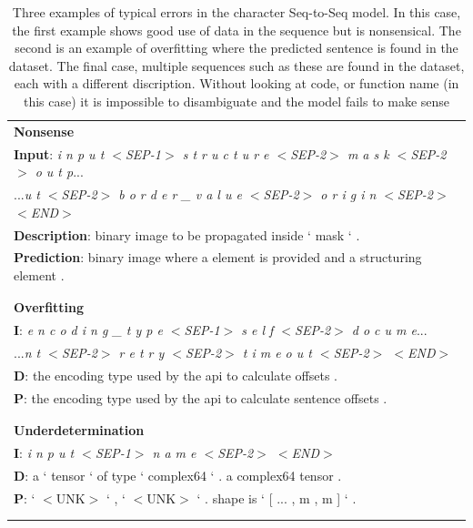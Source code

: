 \begin{table}
\begin{center}
\begin{tabular}{ l  }

\textbf{Nonsense}\\

\textbf{Input}: \textit{i n p u t $<$SEP-1$>$ s t r u c t u r e $<$SEP-2$>$ m a s k $<$SEP-2$>$ o u t p}...\\
...\textit{u t $<$SEP-2$>$ b o r d e r \_ v a l u e $<$SEP-2$>$ o r i g i n $<$SEP-2$>$ $<$END$>$}\\
\textbf{Description}: binary image to be propagated inside ` mask ` .\\
\textbf{Prediction}: binary image where a element is provided and a structuring element . \\

\\\hline\\


\textbf{Overfitting}\\

\textbf{I}: \textit{e n c o d i n g \_ t y p e $<$SEP-1$>$ s e l f $<$SEP-2$>$ d o c u m e}...\\
...\textit{n t $<$SEP-2$>$ r e t r y $<$SEP-2$>$ t i m e o u t $<$SEP-2$>$ $<$END$>$}\\
\textbf{D}: the encoding type used by the api to calculate offsets .\\
\textbf{P}: the encoding type used by the api to calculate sentence offsets . \\
\\\hline\\

\textbf{Underdetermination}\\

\textbf{I}: \textit{i n p u t $<$SEP-1$>$ n a m e $<$SEP-2$>$ $<$END$>$}\\
\textbf{D}: a ` tensor ` of type ` complex64 ` . a complex64 tensor .\\
\textbf{P}: ` $<$UNK$>$ ` , ` $<$UNK$>$ ` . shape is ` [ ... , m , m ] ` . \\
\\\hline\\
\end{tabular}

\caption{Three examples of typical errors in the character Seq-to-Seq model.  In this case, the first example shows good use of data in the sequence but is nonsensical. The second is an example of overfitting where the predicted sentence is found in the dataset. The final case, multiple sequences such as these are found in the dataset, each with a different discription. Without looking at code, or function name (in this case) it is impossible to disambiguate and the model fails to make sense }
\end{center}
\end{table}

